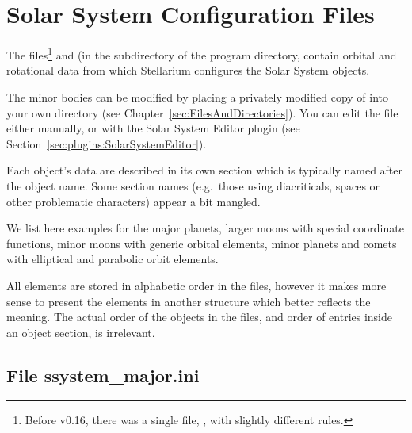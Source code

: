 

\section{Solar System Configuration Files}
\label{sec:ssystem.ini}

The files\footnote{Before v0.16, there was a single file, , with slightly different rules.}
  and    
(in the  subdirectory of the program directory, 
contain orbital and rotational data from which Stellarium configures the Solar
System objects. 

The minor bodies can be modified by placing a privately modified 
copy of  into your own
 directory (see Chapter~\ref{sec:FilesAndDirectories}). 
You can edit the file either manually, or with the
Solar System Editor plugin (see
Section~\ref{sec:plugins:SolarSystemEditor}).



Each object's data are described in its own section which is typically
named after the object name. Some section names (e.g.\ those using
diacriticals, spaces or other problematic characters) appear a bit mangled.

We list here examples for the major planets, larger moons with special
coordinate functions, minor moons with generic orbital elements, minor
planets and comets with elliptical and parabolic orbit elements.

All elements are stored in alphabetic order in the files, however it
makes more sense to present the elements in another structure which
better reflects the meaning. The actual order of the objects in the files, 
and order of entries inside an object section, is irrelevant.

\subsection{File ssystem\_major.ini}
\label{sec:ssystem.ini:major}


